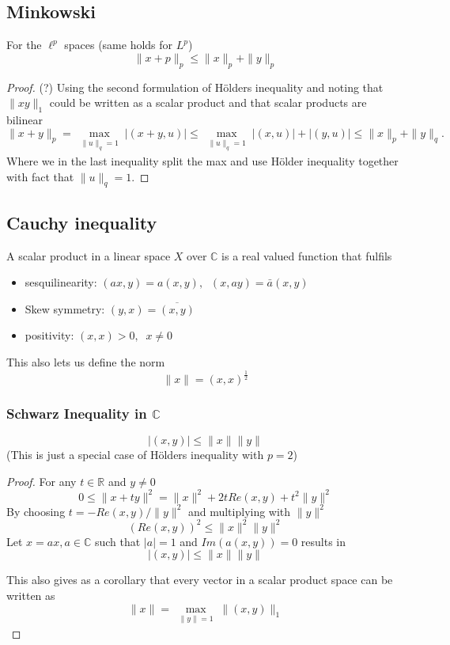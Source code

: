 \documentclass[titlepage]{article}
\begin{document}
\subsection{Minkowski}
For the $\ell^p$ spaces (same holds for $L^p$)
$$\|x+p\|_p \leq\|x\|_p+ \|y\|_p$$
\begin{proof}
(?)
Using the second formulation of Hölders inequality and noting that $\|xy\|_1$ could be written as a scalar product and that scalar products are bilinear
$$\|x+y\|_p = \max\limits_{\substack{\|u\|_q = 1}}|(x+y,u)| \leq
\max\limits_{\substack{\|u\|_q = 1}}|(x,u)|+ |(y,u)| \leq \|x\|_p +\|y\|_q.$$
Where we in the last inequality split the max and use Hölder inequality together with fact that $\|u\|_q = 1.$
\end{proof}
\subsection{Cauchy inequality}
A scalar product in a linear space $X$ over  $\mathbb{C}$ is a real valued function that fulfils 
\begin{itemize}
\item sesquilinearity: $(ax,y) = a(x,y),\;\; (x,ay) = \bar{a}(x,y)$ 
\item Skew symmetry: $(y,x) =  \overline{(x,y)}$ 
\item positivity: $(x,x) > 0,  \;\; x\neq 0$ 
\end{itemize}
This also lets us define the norm  
$$\|x\| = (x,x)^{\frac{1}{2}}$$

\subsubsection{Schwarz Inequality in $\mathbb{C}$}
$$|(x,y)| \leq \|x\|\|y\|$$
(This is just a special case of Hölders inequality with $p= 2$)
\begin{proof}
For any $t \in \mathbb{R}$ and $y\neq 0$
\begin{equation}
0\leq \|x+ty\|^2 = \|x\|^2 + 2tRe(x,y) + t^2\|y\|^2 
\label{scalar}
\end{equation}
By choosing $t = -Re(x,y)/\|y\|^2$ and multiplying with $\|y\|^2$
\begin{equation}
\left(Re(x,y)\right)^2 \leq \|x\|^2\|y\|^2
\end{equation}
Let $x = ax, a\in \mathbb{C}$ such that $|a| = 1$ and $Im(a(x,y)) = 0$
results in
\begin{equation}
|(x,y)| \leq \|x\|\|y\|
\end{equation} 

This also gives as a corollary that every vector in a scalar product space can be written as 
$$ \|x\| = \max\limits_{\substack{\|y\| = 1}}\|(x,y)\|_1$$

\end{proof}
\end{document}
